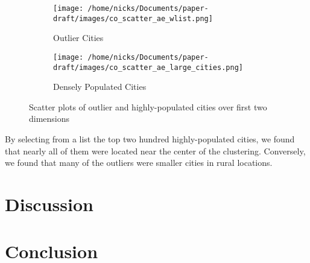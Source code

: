 \documentclass{article}
\begin{document}
\begin{figure}[h!]

\begin{subfigure}{0.5\textwidth}
    \texttt{[image: /home/nicks/Documents/paper-draft/images/co\_scatter\_ae\_wlist.png]} 
    \caption{Outlier Cities}
    \label{fig:outliers}
\end{subfigure}%
\begin{subfigure}{0.5\textwidth}
    \texttt{[image: /home/nicks/Documents/paper-draft/images/co\_scatter\_ae\_large\_cities.png]}
    \caption{Densely Populated Cities}
    \label{fig:dense_cities}
\end{subfigure}

\caption{Scatter plots of outlier and highly-populated cities over first two dimensions}
\label{fig:outliers_vs_dense_cities}
\end{figure}

By selecting from a list the top two hundred highly-populated cities, we found that nearly
all of them were located near the center of the clustering. Conversely, we found that many 
of the outliers were smaller cities in rural locations.

\section{Discussion}

\section{Conclusion}

\printbibliography
\end{document}
